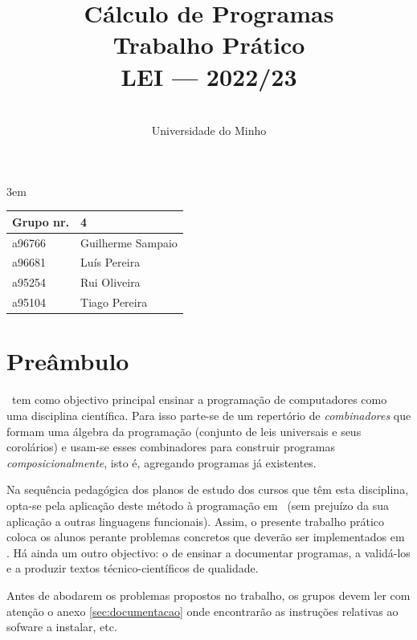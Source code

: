 \documentclass[a4paper]{article}
\title{
          \textbf{Cálculo de Programas}
\\
          Trabalho Prático
\\
          LEI --- 2022/23
}
\author{
          \dium
\\
          Universidade do Minho
}
\date\mydate
\begin{document}
\emergencystretch 3em

\maketitle

\begin{center}\large
\begin{tabular}{ll}
Grupo nr. & 4
\\\hline
a96766 & Guilherme Sampaio
\\
a96681 & Luís Pereira
\\
a95254 & Rui Oliveira
\\
a95104 & Tiago Pereira
\end{tabular}
\end{center}

\section*{Preâmbulo}

\CP\ tem como objectivo principal ensinar
a progra\-mação de computadores como uma disciplina científica. Para isso
parte-se de um repertório de \emph{combinadores} que formam uma álgebra da
programação (conjunto de leis universais e seus corolários) e usam-se esses
combinadores para construir programas \emph{composicionalmente}, isto é,
agregando programas já existentes.

Na sequência pedagógica dos planos de estudo dos cursos que têm
esta disciplina, opta-se pela aplicação deste método à programação
em \Haskell\ (sem prejuízo da sua aplicação a outras linguagens
funcionais). Assim, o presente trabalho prático coloca os
alunos perante problemas concretos que deverão ser implementados em
\Haskell.  Há ainda um outro objectivo: o de ensinar a documentar
programas, a validá-los e a produzir textos técnico-científicos de
qualidade.

Antes de abodarem os problemas propostos no trabalho, os grupos devem ler
com atenção o anexo \ref{sec:documentacao} onde encontrarão as instruções
relativas ao sofware a instalar, etc.
\end{document}
